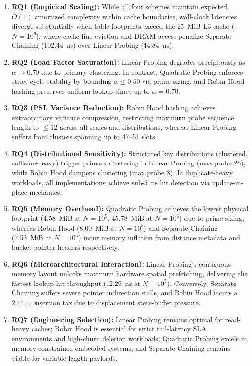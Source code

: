 \documentclass[conference]{IEEEtran}
\begin{document}
\begin{enumerate}
  \item \textbf{RQ1 (Empirical Scaling):} While all four schemes maintain expected $O(1)$ amortized complexity within cache boundaries, wall-clock latencies diverge substantially when table footprints exceed the 25~MiB L3 cache ($N = 10^6$), where cache line eviction and DRAM access penalize Separate Chaining (102.44~ns) over Linear Probing (44.84~ns).
  \item \textbf{RQ2 (Load Factor Saturation):} Linear Probing degrades precipitously as $\alpha \to 0.70$ due to primary clustering. In contrast, Quadratic Probing enforces strict cycle stability by bounding $\alpha \le 0.50$ via prime sizing, and Robin Hood hashing preserves uniform lookup times up to $\alpha = 0.70$.
  \item \textbf{RQ3 (PSL Variance Reduction):} Robin Hood hashing achieves extraordinary variance compression, restricting maximum probe sequence length to $\le 12$ across all scales and distributions, whereas Linear Probing suffers from clusters spanning up to 47--51 slots.
  \item \textbf{RQ4 (Distributional Sensitivity):} Structured key distributions (clustered, collision-heavy) trigger primary clustering in Linear Probing (max probe 28), while Robin Hood dampens clustering (max probe 8). In duplicate-heavy workloads, all implementations achieve sub-5~ns hit detection via update-in-place mechanics.
  \item \textbf{RQ5 (Memory Overhead):} Quadratic Probing achieves the lowest physical footprint (4.58~MiB at $N = 10^5$, 45.78~MiB at $N = 10^6$) due to prime sizing, whereas Robin Hood (8.00~MiB at $N = 10^5$) and Separate Chaining (7.53~MiB at $N = 10^5$) incur memory inflation from distance metadata and bucket pointer headers respectively.
  \item \textbf{RQ6 (Microarchitectural Interaction):} Linear Probing's contiguous memory layout unlocks maximum hardware spatial prefetching, delivering the fastest lookup hit throughput (12.29~ns at $N = 10^5$). Conversely, Separate Chaining suffers severe pointer indirection stalls, and Robin Hood incurs a $2.14\times$ insertion tax due to displacement store-buffer pressure.
  \item \textbf{RQ7 (Engineering Selection):} Linear Probing remains optimal for read-heavy caches; Robin Hood is essential for strict tail-latency SLA environments and high-churn deletion workloads; Quadratic Probing excels in memory-constrained embedded systems; and Separate Chaining remains viable for variable-length payloads.
\end{enumerate}
\end{document}
